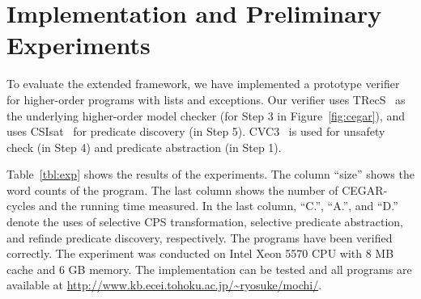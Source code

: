 
\vspace{-5pt}
\section{Implementation and Preliminary Experiments}
\label{sec:experiments}

To evaluate the extended framework, we have implemented a prototype
verifier for higher-order programs with lists and exceptions.
Our verifier uses TRecS~\cite{KobayashiPOPL2009,KobayashiPPDP2009} as
the underlying higher-order model checker (for Step 3 in
Figure~\ref{fig:cegar}), and uses CSIsat~\cite{Beyer2008} for predicate
discovery (in Step 5).  CVC3~\cite{Barrett2007} is used for unsafety
check (in Step 4) and predicate abstraction (in Step 1).

Table~\ref{tbl:exp} shows the results of the experiments.  The column
``size'' shows the word counts of the program.  The last column shows
the number of CEGAR-cycles and the running time measured.  In the last
column, ``C.'', ``A.'', and ``D.''  denote the uses of selective CPS
transformation, selective predicate abstraction, and refinde predicate
discovery, respectively.  The programs have been verified correctly.
The experiment was conducted on Intel Xeon 5570 CPU with 8 MB cache and
6 GB memory.  The implementation can be tested and all programs are
available at \url{http://www.kb.ecei.tohoku.ac.jp/~ryosuke/mochi/}.

